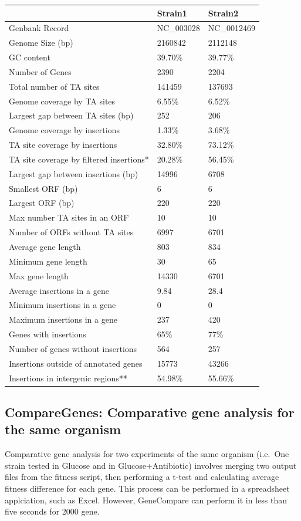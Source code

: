 \documentclass[11pt,]{article}
\begin{document}
\begin{longtable}[]{@{}lll@{}}
\toprule
\begin{minipage}[b]{0.32\columnwidth}\raggedright\strut
\strut
\end{minipage} & \begin{minipage}[b]{0.32\columnwidth}\raggedright\strut
Strain1\strut
\end{minipage} & \begin{minipage}[b]{0.32\columnwidth}\raggedright\strut
Strain2\strut
\end{minipage}\tabularnewline
\midrule
\endhead
Genbank Record & NC\_003028 & NC\_0012469\tabularnewline
Genome Size (bp) & 2160842 & 2112148\tabularnewline
GC content & 39.70\% & 39.77\%\tabularnewline
Number of Genes & 2390 & 2204\tabularnewline
Total number of TA sites & 141459 & 137693\tabularnewline
Genome coverage by TA sites & 6.55\% & 6.52\%\tabularnewline
Largest gap between TA sites (bp) & 252 & 206\tabularnewline
Genome coverage by insertions & 1.33\% & 3.68\%\tabularnewline
TA site coverage by insertions & 32.80\% & 73.12\%\tabularnewline
TA site coverage by filtered insertions* & 20.28\% &
56.45\%\tabularnewline
Largest gap between insertions (bp) & 14996 & 6708\tabularnewline
Smallest ORF (bp) & 6 & 6\tabularnewline
Largest ORF (bp) & 220 & 220\tabularnewline
Max number TA sites in an ORF & 10 & 10\tabularnewline
Number of ORFs without TA sites & 6997 & 6701\tabularnewline
Average gene length & 803 & 834\tabularnewline
Minimum gene length & 30 & 65\tabularnewline
Max gene length & 14330 & 6701\tabularnewline
Average insertions in a gene & 9.84 & 28.4\tabularnewline
Minimum insertions in a gene & 0 & 0\tabularnewline
Maximum insertions in a gene & 237 & 420\tabularnewline
Genes with insertions & 65\% & 77\%\tabularnewline
Number of genes without insertions & 564 & 257\tabularnewline
Insertions outside of annotated genes & 15773 & 43266\tabularnewline
Insertions in intergenic regions** & 54.98\% & 55.66\%\tabularnewline
\bottomrule
\end{longtable}

\subsection{CompareGenes: Comparative gene analysis for the same
organism}\label{comparegenes-comparative-gene-analysis-for-the-same-organism}

Comparative gene analysis for two experiments of the same organism
(i.e.~One strain tested in Glucose and in Glucose+Antibiotic) involves
merging two output files from the fitness script, then performing a
t-test and calculating average fitness difference for each gene. This
process can be performed in a spreadsheet applciation, such as Excel.
However, GeneCompare can perform it in less than five seconds for 2000
gene.
\end{document}
